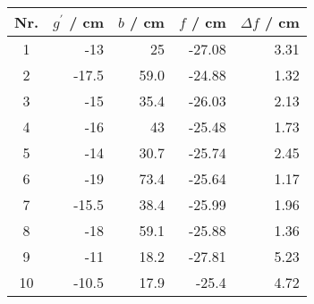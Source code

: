 \begin{tabular}{c|rrrr}
Nr. & $g^\prime$ / cm & $b$ / cm & $f$ / cm & $\Delta f$ / cm \\
\hline
1 & -13 & 25 & -27.08 & 3.31\\
2 & -17.5 & 59.0 & -24.88 & 1.32\\
3 & -15 & 35.4 & -26.03 & 2.13\\
4 & -16 & 43 & -25.48 & 1.73\\
5 & -14 & 30.7 & -25.74 & 2.45\\
6 & -19 & 73.4 & -25.64 & 1.17\\
7 & -15.5 & 38.4 & -25.99 & 1.96\\
8 & -18 & 59.1 & -25.88 & 1.36\\
9 & -11 & 18.2 & -27.81 & 5.23\\
10 & -10.5 & 17.9 & -25.4 & 4.72
\end{tabular}
